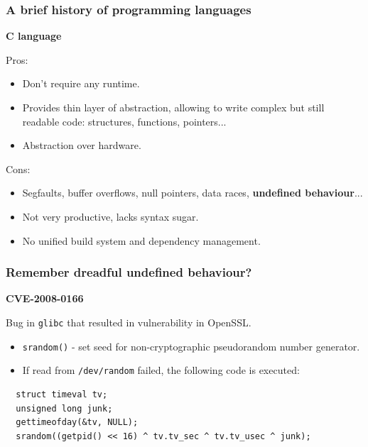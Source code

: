 \documentclass[aspectratio=1610,t]{beamer}
\begin{document}

\begin{frame}
\frametitle{A brief history of programming languages}
\textbf{C language}

Pros:
\begin{itemize}
\item Don't require any runtime.
\item Provides thin layer of abstraction, allowing to write complex but still readable code: structures, functions, pointers...
\item Abstraction over hardware.
\end{itemize}

Cons:
\begin{itemize}
\item Segfaults, buffer overflows, null pointers, data races, \textbf{undefined behaviour}...
\item Not very productive, lacks syntax sugar.
\item No unified build system and dependency management.
\end{itemize}
\end{frame}


\begin{frame}[fragile]
\frametitle{Remember dreadful undefined behaviour?}
\textbf{CVE-2008-0166}

Bug in \texttt{glibc} that resulted in vulnerability in OpenSSL.

\begin{itemize}
    \item \texttt{srandom()} - set seed for non-cryptographic pseudorandom number generator.
    \item If read from \texttt{/dev/random} failed, the following code is executed:
\end{itemize}

\begin{verbatim}
  struct timeval tv;
  unsigned long junk;
  gettimeofday(&tv, NULL);
  srandom((getpid() << 16) ^ tv.tv_sec ^ tv.tv_usec ^ junk);
\end{verbatim}

\end{frame}

\end{document}
